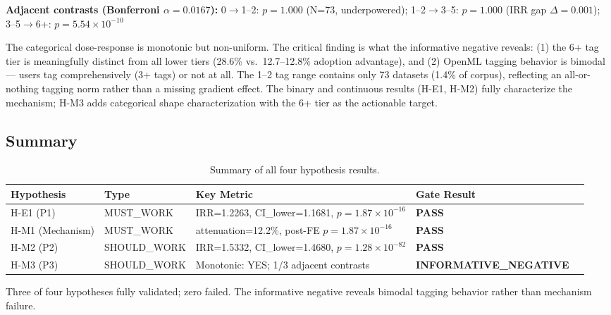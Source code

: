\textbf{Adjacent contrasts (Bonferroni $\alpha=0.0167$):} 0$\rightarrow$1--2: $p=1.000$ (N=73, underpowered); 1--2$\rightarrow$3--5: $p=1.000$ (IRR gap $\Delta=0.001$); 3--5$\rightarrow$6+: $p=5.54 \times 10^{-10}$ \checkmark

The categorical dose-response is monotonic but non-uniform. The critical finding is what the informative negative reveals: (1) the 6+ tag tier is meaningfully distinct from all lower tiers (28.6\% vs.\ 12.7--12.8\% adoption advantage), and (2) OpenML tagging behavior is bimodal --- users tag comprehensively (3+ tags) or not at all. The 1--2 tag range contains only 73 datasets (1.4\% of corpus), reflecting an all-or-nothing tagging norm rather than a missing gradient effect. The binary and continuous results (H-E1, H-M2) fully characterize the mechanism; H-M3 adds categorical shape characterization with the 6+ tier as the actionable target.

\subsection{Summary}

\begin{table}[h]
\centering
\caption{Summary of all four hypothesis results.}
\label{tab:summary}
\begin{tabular}{lllll}
\toprule
Hypothesis & Type & Key Metric & Gate Result \\
\midrule
H-E1 (P1) & MUST\_WORK & IRR=1.2263, CI\_lower=1.1681, $p=1.87 \times 10^{-16}$ & \textbf{PASS} \\
H-M1 (Mechanism) & MUST\_WORK & attenuation=12.2\%, post-FE $p=1.87 \times 10^{-16}$ & \textbf{PASS} \\
H-M2 (P2) & SHOULD\_WORK & IRR=1.5332, CI\_lower=1.4680, $p=1.28 \times 10^{-82}$ & \textbf{PASS} \\
H-M3 (P3) & SHOULD\_WORK & Monotonic: YES; 1/3 adjacent contrasts & \textbf{INFORMATIVE\_NEGATIVE} \\
\bottomrule
\end{tabular}
\end{table}

Three of four hypotheses fully validated; zero failed. The informative negative reveals bimodal tagging behavior rather than mechanism failure.
